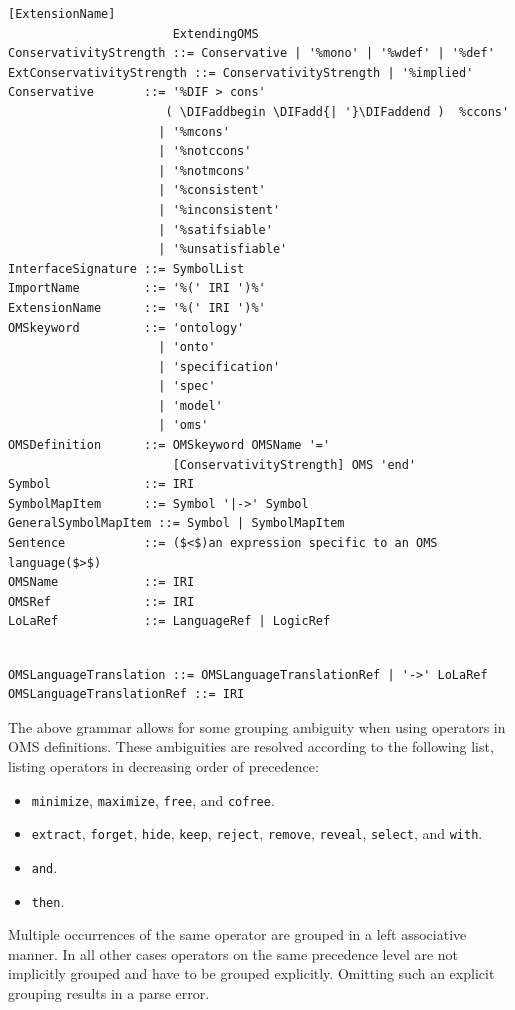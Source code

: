 \documentclass[10pt,fleqn,final]{scrreprt}
\newcommand*{\syntax}[1]{\texttt{#1}}
\newenvironment{definitions}[0]{\medskip }{}
\providecommand{\DIFadd}[1]{{\protect\color{blue}\uwave{#1}}} %
\providecommand{\DIFaddbegin}{} %
\providecommand{\DIFaddend}{} %
\begin{document}
\begin{definitions}
\begin{lstlisting}[language=ebnf,escapeinside={()},mathescape]
                       [ExtensionName]
                       ExtendingOMS
ConservativityStrength ::= Conservative | '%mono' | '%wdef' | '%def'
ExtConservativityStrength ::= ConservativityStrength | '%implied'
Conservative       ::= '%DIF > cons'
                      ( \DIFaddbegin \DIFadd{| '}\DIFaddend )  %ccons'
                     | '%mcons'
                     | '%notccons'
                     | '%notmcons'
                     | '%consistent'
                     | '%inconsistent'
                     | '%satifsiable'
                     | '%unsatisfiable'
InterfaceSignature ::= SymbolList
ImportName         ::= '%(' IRI ')%'
ExtensionName      ::= '%(' IRI ')%'
OMSkeyword         ::= 'ontology'
                     | 'onto'
                     | 'specification'
                     | 'spec'
                     | 'model'
                     | 'oms'
OMSDefinition      ::= OMSkeyword OMSName '='
                       [ConservativityStrength] OMS 'end'
Symbol             ::= IRI
SymbolMapItem      ::= Symbol '|->' Symbol
GeneralSymbolMapItem ::= Symbol | SymbolMapItem
Sentence           ::= ($<$)an expression specific to an OMS language($>$) 
OMSName            ::= IRI
OMSRef             ::= IRI
LoLaRef            ::= LanguageRef | LogicRef
\end{lstlisting}


\begin{lstlisting}[language=ebnf,mathescape]

OMSLanguageTranslation ::= OMSLanguageTranslationRef | '->' LoLaRef
OMSLanguageTranslationRef ::= IRI
\end{lstlisting}



The above grammar allows for some grouping ambiguity when using operators in
OMS definitions. These ambiguities are resolved according to the following
list, listing operators in decreasing order of precedence:
\begin{itemize}
  \item \syntax{minimize}, \syntax{maximize}, \syntax{free}, and \syntax{cofree}. 
  \item \syntax{extract}, \syntax{forget}, \syntax{hide}, \syntax{keep},
    \syntax{reject}, \syntax{remove}, \syntax{reveal}, \syntax{select}, and
    \syntax{with}.
  \item \syntax{and}.
  \item \syntax{then}.
\end{itemize}
Multiple occurrences of the same operator are grouped in a left associative
manner. In all other cases operators on the same precedence level are not
implicitly grouped and have to be grouped explicitly. Omitting such an explicit
grouping results in a parse error.



\end{definitions}
\end{document}
